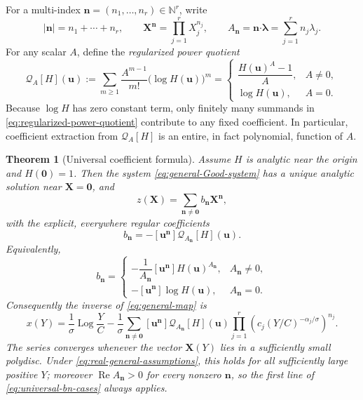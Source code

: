 \documentclass[11pt,oneside]{article}
\theoremstyle{plain}
\newtheorem{theorem}{Theorem}[section]
\theoremstyle{definition}
\theoremstyle{remark}
\newcommand{\N}{\mathbb{N}}
\newcommand{\abs}[1]{\left\lvert#1\right\rvert}
\newcommand{\Real}{\operatorname{Re}}
\newcommand{\Log}{\operatorname{Log}}
\begin{document}
For a multi-index
\(\bm n=(n_1,\ldots,n_r)\in\N^r\), write
\begin{equation}
 \abs{\bm n}=n_1+\cdots+n_r,
 \qquad
 \bm X^{\bm n}=\prod_{j=1}^rX_j^{n_j},
 \qquad
 A_{\bm n}=\bm n\mathbin{\bm\cdot}\bm\lambda
 =\sum_{j=1}^rn_j\lambda_j.
 \label{eq:multiindex-A}
\end{equation}
For any scalar \(A\), define the \emph{regularized power quotient}
\begin{equation}
 \mathscr Q_A[H](\bm u)
 :=\sum_{m\ge1}\frac{A^{m-1}}{m!}\bigl(\log H(\bm u)\bigr)^m
 =\begin{cases}
 \dfrac{H(\bm u)^A-1}{A},&A\ne0,\\[0.7em]
 \log H(\bm u),&A=0.
 \end{cases}
 \label{eq:regularized-power-quotient}
\end{equation}
Because \(\log H\) has zero constant term, only finitely many summands in
\eqref{eq:regularized-power-quotient} contribute to any fixed coefficient.
In particular, coefficient extraction from \(\mathscr Q_A[H]\) is an entire,
in fact polynomial, function of \(A\).

\begin{theorem}[Universal coefficient formula]
\label{thm:universal-inversion}
Assume \(H\) is analytic near the origin and \(H(\bm0)=1\).  Then the system
\eqref{eq:general-Good-system} has a unique analytic solution near
\(\bm X=\bm0\), and
\begin{equation}
 z(\bm X)=\sum_{\bm n\ne\bm0}b_{\bm n}\bm X^{\bm n},
 \label{eq:z-general-series}
\end{equation}
with the explicit, everywhere regular coefficients
\begin{equation}
 \boxed{
 b_{\bm n}=-[\bm u^{\bm n}]\mathscr Q_{A_{\bm n}}[H](\bm u).}
 \label{eq:universal-bn}
\end{equation}
Equivalently,
\begin{equation}
 b_{\bm n}=
 \begin{cases}
 -\dfrac1{A_{\bm n}}[\bm u^{\bm n}]H(\bm u)^{A_{\bm n}},
       &A_{\bm n}\ne0,\\[0.9em]
 -[\bm u^{\bm n}]\log H(\bm u),&A_{\bm n}=0.
 \end{cases}
 \label{eq:universal-bn-cases}
\end{equation}
Consequently the inverse of \eqref{eq:general-map} is
\begin{equation}
 \boxed{
 x(Y)=\frac1\sigma\Log\frac YC
 -\frac1\sigma\sum_{\bm n\ne\bm0}
 [\bm u^{\bm n}]\mathscr Q_{A_{\bm n}}[H](\bm u)
 \prod_{j=1}^r
 \left(c_j(Y/C)^{-\alpha_j/\sigma}\right)^{n_j}.}
 \label{eq:universal-inverse}
\end{equation}
The series converges whenever the vector \(\bm X(Y)\) lies in a sufficiently
small polydisc.  Under \eqref{eq:real-general-assumptions}, this holds for all
sufficiently large positive \(Y\); moreover \(\Real A_{\bm n}>0\) for every
nonzero \(\bm n\), so the first line of \eqref{eq:universal-bn-cases} always
applies.
\end{theorem}
\end{document}
